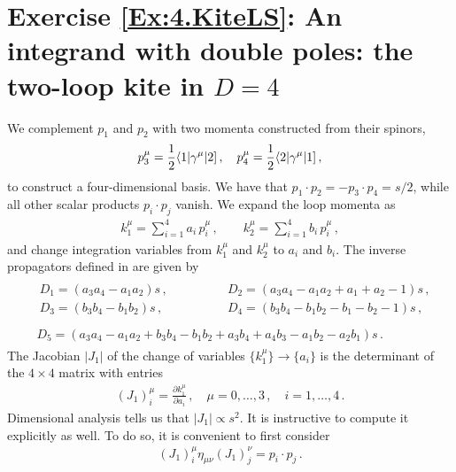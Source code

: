 \section*{Exercise \ref{Ex:4.KiteLS}: An integrand with double poles: the two-loop kite in $D=4$}
\label{Sol:4.KiteLS}
%
We complement $p_1$ and $p_2$ with two momenta constructed from their spinors,
\begin{align}
p_3^{\mu} = \frac{1}{2} \langle 1 | \gamma^{\mu} | 2 ] \,, \quad p_4^{\mu} = \frac{1}{2} \langle 2 | \gamma^{\mu} | 1 ] \,,
\end{align}
to construct a four-dimensional basis. We have that $p_1 \cdot p_2  = - p_3 \cdot p_4 = s/2$,
while all other scalar products $p_i \cdot p_j$ vanish. We expand the loop momenta as
\begin{align}
k_1^{\mu} = \sum_{i=1}^4 a_i \, p_i^{\mu} \,, \qquad k_2^{\mu} = \sum_{i=1}^4 b_i \, p_i^{\mu} \,,
\end{align}
and change integration variables from $k_1^{\mu}$ and $k_2^{\mu}$ to $a_i$ and $b_i$. 
The inverse propagators defined in  are given by
\begin{align}\label{eq:D2ab}
\begin{aligned}
& \begin{array}{ll}
D_1 = \left(a_3 a_4 - a_1 a_2\right) s \,, \qquad \qquad & D_2 = \left(a_3 a_4 - a_1 a_2 + a_1 + a_2  -1 \right) s \,, \\
D_3 = \left(b_3 b_4 - b_1 b_2\right) s \,, \qquad \qquad & D_4 = \left(b_3 b_4 - b_1 b_2 - b_1 - b_2  -1 \right) s \,, \\
\end{array} \\
& \, D_5 = \left(a_3 a_4 - a_1 a_2 + b_3 b_4  - b_1 b_2 + a_3 b_4 + a_4 b_3 - a_1 b_2 - a_2 b_1 \right) s   \,.
\end{aligned}
\end{align}
The Jacobian $|J_1|$ of the change of variables $\{k_1^{\mu}\} \to \{a_i\}$ is the determinant of the $4 \times 4$ matrix with entries
\begin{align}
\left(J_1\right)^{\mu}_i = \frac{\partial k_1^{\mu}}{\partial a_i} \,, \quad \mu=0,\ldots,3 \,, \quad i=1,\ldots, 4\,.
\end{align}
Dimensional analysis tells us that $|J_1| \propto s^2$. It is instructive to compute it explicitly as well.
To do so, it is convenient to first consider
\begin{align}
\left(J_1\right)^{\mu}_i \eta_{\mu \nu} \left(J_1\right)^{\nu}_j = p_i \cdot p_j \,.
\end{align}

